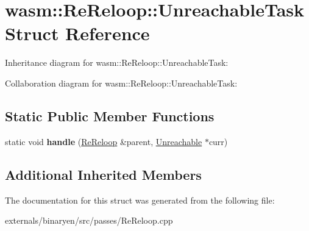 \hypertarget{structwasm_1_1_re_reloop_1_1_unreachable_task}{}\section{wasm\+:\+:Re\+Reloop\+:\+:Unreachable\+Task Struct Reference}
\label{structwasm_1_1_re_reloop_1_1_unreachable_task}


Inheritance diagram for wasm\+:\+:Re\+Reloop\+:\+:Unreachable\+Task\+:


Collaboration diagram for wasm\+:\+:Re\+Reloop\+:\+:Unreachable\+Task\+:
\subsection*{Static Public Member Functions}
\begin{DoxyCompactItemize}
\item 
\mbox{\label{structwasm_1_1_re_reloop_1_1_unreachable_task_aabbd694610b8d775e813abcd2f7ff0e1}} 
static void {\bfseries handle} (\mbox{\hyperlink{structwasm_1_1_re_reloop}{Re\+Reloop}} \&parent, \mbox{\hyperlink{classwasm_1_1_unreachable}{Unreachable}} $\ast$curr)
\end{DoxyCompactItemize}
\subsection*{Additional Inherited Members}


The documentation for this struct was generated from the following file\+:\begin{DoxyCompactItemize}
\item 
externals/binaryen/src/passes/Re\+Reloop.\+cpp\end{DoxyCompactItemize}
